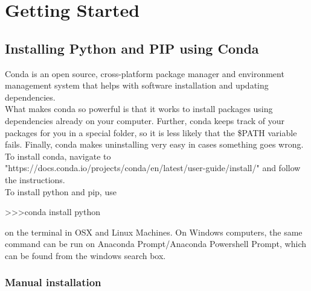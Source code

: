 \chapter{Getting Started}

\section{Installing Python and PIP using Conda}

Conda is an open source, cross-platform package manager and environment management system that helps with software installation and updating dependencies. \\

What makes conda so powerful is that it works to install packages using dependencies already on your computer. Further, conda keeps track of your packages for you in a special folder, so it is less likely that the \$PATH variable fails. Finally, conda makes uninstalling very easy in cases something goes wrong. \\

To install conda, navigate to "https://docs.conda.io/projects/conda/en/latest/user-guide/install/" and follow the instructions.\\

To install python and pip, use \\

\begin{mdframed}
\textgreater \textgreater\textgreater \quad conda install python
\end{mdframed}

on the terminal in OSX and Linux Machines. On Windows computers, the same command can be run on Anaconda Prompt/Anaconda Powershell Prompt, which can be found from the windows search box.





\subsection{Manual installation}

